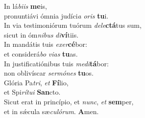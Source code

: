 \oddverse In lá\textit{bi}\textit{is} \textbf{me}is,~\*\\
\oddverse pronuntiávi ómnia judíci\textit{a} \textit{o}\textit{ris} \textbf{tu}i.\\
\evenverse In via testimoniórum tuórum \textit{de}\textit{le}\textbf{ctá}tus sum,~\*\\
\evenverse sicut in óm\textit{ni}\textit{bus} \textit{di}\textbf{ví}tiis.\\
\oddverse In mandátis tuis \textit{e}\textit{xer}\textbf{cé}bor:~\*\\
\oddverse et considerá\textit{bo} \textit{vi}\textit{as} \textbf{tu}as.\\
\evenverse In justificatiónibus tuis \textit{me}\textit{di}\textbf{tá}bor:~\*\\
\evenverse non oblivíscar \textit{ser}\textit{mó}\textit{nes} \textbf{tu}os.\\
\oddverse Glória Pa\textit{tri}, \textit{et} \textbf{Fí}lio,~\*\\
\oddverse et Spi\textit{rí}\textit{tu}\textit{i} \textbf{San}cto.\\
\evenverse Sicut erat in princípio, et \textit{nunc}, \textit{et} \textbf{sem}per,~\*\\
\evenverse et in sǽcula sæ\textit{cu}\textit{ló}\textit{rum}. \textbf{A}men.\\
